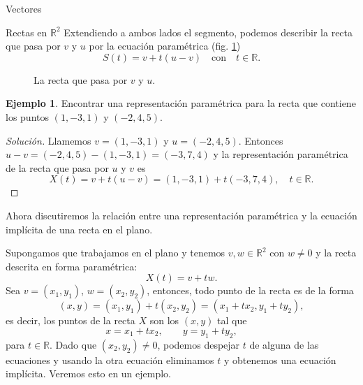 \documentclass[a4paper,12pt,twoside,spanish,reqno]{amsbook}
\theoremstyle{definition}
\newtheorem{ejemplo}{Ejemplo}[section]
\theoremstyle{remark}
\newcommand{\R}{\mathbb R}
\begin{document}
\begin{chapter}{Vectores}
\begin{section}{Rectas en $\R^2$}
		Extendiendo a ambos lados el segmento, podemos describir la recta que pasa por $v$ y $u$ por la ecuación paramétrica (fig. \ref{fig-recta-entre-puntos})
		\begin{equation*}
		S(t) = v + t(u-v)\quad  \text{con}\quad t \in \R.
		\end{equation*}
		\begin{figure}[h]
			\caption{La recta que pasa por $v$ y $u$.}
			\label{fig-recta-entre-puntos}
		\end{figure} 
		
		\begin{ejemplo}
			Encontrar una representación paramétrica para la recta que contiene los puntos $(1, - 3, 1)$ y $(- 2,4,5)$.
		\end{ejemplo}	
		\begin{proof}[Solución] Llamemos $v = (1, - 3, 1)$ y $u =(- 2,4,5)$. Entonces $u-v = (- 2,4,5) - (1,-3,1) = (-3,7,4)$ y la representación paramétrica de la recta que pasa por $u$ y $v$  es 
		\begin{equation*}
			X (t) = v + t(u-v) = (1, -3,1) + t (-3, 7, 4),\quad t\in \R.
		\end{equation*}
		\end{proof}
	
		Ahora discutiremos la relación entre una representación paramétrica y la ecuación implícita de una recta en el plano.
		
		Supongamos que trabajamos en el plano y tenemos $v, w \in \R^2$ con $w \not= 0$ y la recta descrita en forma paramétrica:
		\begin{equation*}
		X(t) =v +tw.
		\end{equation*}
		Sea $v = (x_1,y_1)$, $w = (x_2,y_2)$,  entonces, todo punto de la recta es de la forma
		\begin{equation*}
		(x,y) =(x_1,y_1) +t(x_2,y_2) = (x_1+tx_2,y_1+ty_2),
		\end{equation*}
		es decir, los puntos de la recta $X$ son los $(x,y)$ tal que
		\begin{equation*}
			x = x_1+tx_2, \qquad y = y_1+ty_2, \qquad
		\end{equation*}
		para $t \in \R$. Dado  que $(x_2,y_2) \ne 0$, podemos despejar $t$  de alguna de las ecuaciones y usando la otra ecuación eliminamos $t$ y obtenemos una ecuación implícita. Veremos esto en un ejemplo.
		

\end{section}
\end{chapter}
\end{document}
